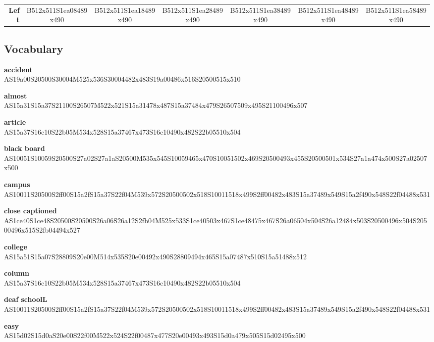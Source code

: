 \documentclass{article}
\begin{document}
\begin{center}
\begin{tabular}{r*{6}{c}}
\textbf{Left}&
B512x511S1ea08489x490&
B512x511S1ea18489x490&
B512x511S1ea28489x490&
B512x511S1ea38489x490&
B512x511S1ea48489x490&
B512x511S1ea58489x490\\
\end{tabular}
\end{center}

\subsection{Vocabulary}

\begin{glossary}

\textbf{accident}\\
AS19a00S20500S30004M525x536S30004482x483S19a00486x516S20500515x510

\textbf{almost}\\
AS15a31S15a37S21100S26507M522x521S15a31478x487S15a37484x479S26507509x495S21100496x507

\textbf{article}\\
AS15a37S16c10S22b05M534x528S15a37467x473S16c10490x482S22b05510x504

\textbf{black board}\\
AS10051S10059S20500S27a02S27a1aS20500M535x545S10059465x470S10051502x469S20500493x455S20500501x534S27a1a474x500S27a02507x500

\textbf{campus}\\
AS10011S20500S2ff00S15a2fS15a37S22f04M539x572S20500502x518S10011518x499S2ff00482x483S15a37489x549S15a2f490x548S22f04488x531

\textbf{close captioned}\\
AS1ce40S1ce48S20500S20500S26a06S26a12S2fb04M525x533S1ce40503x467S1ce48475x467S26a06504x504S26a12484x503S20500496x504S20500496x515S2fb04494x527

\textbf{college}\\
AS15a51S15a07S28809S20e00M514x535S20e00492x490S28809494x465S15a07487x510S15a51488x512

\textbf{column}\\
AS15a37S16c10S22b05M534x528S15a37467x473S16c10490x482S22b05510x504

\textbf{deaf schoolL}\\
AS10011S20500S2ff00S15a2fS15a37S22f04M539x572S20500502x518S10011518x499S2ff00482x483S15a37489x549S15a2f490x548S22f04488x531

\textbf{easy}\\
AS15d02S15d0aS20e00S22f00M522x524S22f00487x477S20e00493x493S15d0a479x505S15d02495x500


\end{glossary}
\end{document}

